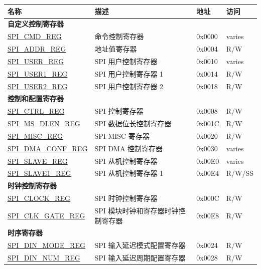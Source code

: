\begin{longtable}{ | p{6cm} | p{6.6cm} | p{1.3cm} | p{1.7cm} | }

\hline\rowcolor{lightgray}
\textbf{名称} & \textbf{描述} &  \textbf{地址} & \textbf{访问} \\ \hline
\endhead
\multicolumn{4}{|l|}{\textbf{自定义控制寄存器}} \\ \hline
\hyperref[regdesc:SPICMDREG]{SPI\_CMD\_REG} & 命令控制寄存器 & 0x0000 & varies \\ \hline
\hyperref[regdesc:SPIADDRREG]{SPI\_ADDR\_REG} & 地址值寄存器 & 0x0004 & R/W \\ \hline
\hyperref[regdesc:SPIUSERREG]{SPI\_USER\_REG} & SPI 用户控制寄存器 & 0x0010 & varies \\ \hline
\hyperref[regdesc:SPIUSER1REG]{SPI\_USER1\_REG} & SPI 用户控制寄存器 1 & 0x0014 & R/W \\ \hline
\hyperref[regdesc:SPIUSER2REG]{SPI\_USER2\_REG} & SPI 用户控制寄存器 2 & 0x0018 & R/W \\ \hline
\multicolumn{4}{|l|}{\textbf{控制和配置寄存器}} \\ \hline
\hyperref[regdesc:SPICTRLREG]{SPI\_CTRL\_REG} & SPI 控制寄存器 & 0x0008 & R/W \\ \hline
\hyperref[regdesc:SPIMSDLENREG]{SPI\_MS\_DLEN\_REG} & SPI 数据位长控制寄存器 & 0x001C & R/W \\ \hline
\hyperref[regdesc:SPIMISCREG]{SPI\_MISC\_REG} & SPI MISC 寄存器 & 0x0020 & R/W \\ \hline
\hyperref[regdesc:SPIDMACONFREG]{SPI\_DMA\_CONF\_REG} & SPI DMA 控制寄存器 & 0x0030 & varies \\ \hline
\hyperref[regdesc:SPISLAVEREG]{SPI\_SLAVE\_REG} & SPI 从机控制寄存器 & 0x00E0 & varies \\ \hline
\hyperref[regdesc:SPISLAVE1REG]{SPI\_SLAVE1\_REG} & SPI 从机控制寄存器 1 & 0x00E4 & R/W/SS \\ \hline
\multicolumn{4}{|l|}{\textbf{时钟控制寄存器}} \\ \hline
\hyperref[regdesc:SPICLOCKREG]{SPI\_CLOCK\_REG} & SPI 时钟控制寄存器 & 0x000C & R/W \\ \hline
\hyperref[regdesc:SPICLKGATEREG]{SPI\_CLK\_GATE\_REG} & SPI 模块时钟和寄存器时钟控制寄存器 & 0x00E8 & R/W \\ \hline
\multicolumn{4}{|l|}{\textbf{时序寄存器}} \\ \hline
\hyperref[regdesc:SPIDINMODEREG]{SPI\_DIN\_MODE\_REG} & SPI 输入延迟模式配置寄存器 & 0x0024 & R/W \\ \hline
\hyperref[regdesc:SPIDINNUMREG]{SPI\_DIN\_NUM\_REG} & SPI 输入延迟周期配置寄存器 & 0x0028 & R/W \\ \hline

\end{longtable}
